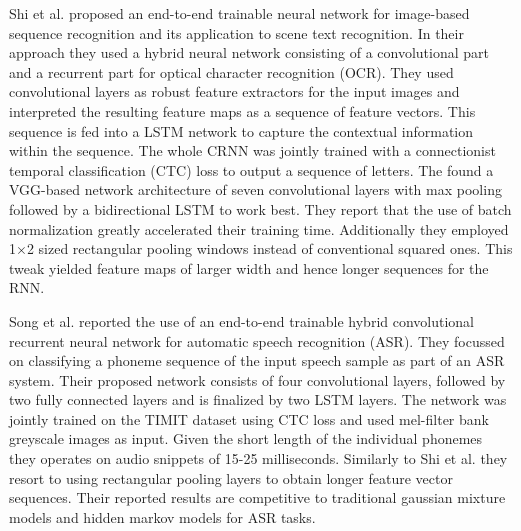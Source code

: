 Shi et al.\cite{shi2016end} proposed an end-to-end trainable neural network for image-based sequence recognition and its application to scene text recognition. In their approach they used a hybrid neural network consisting of a convolutional part and a recurrent part for optical character recognition (OCR). They used convolutional layers as robust feature extractors for the input images and interpreted the resulting feature maps as a sequence of feature vectors. This sequence is fed into a LSTM network to capture the contextual information within the sequence. The whole CRNN was jointly trained with a connectionist temporal classification (CTC) loss \cite{graves2006connectionist} to output a sequence of letters. The found a VGG-based network architecture of seven convolutional layers with max pooling followed by a bidirectional LSTM to work best. They report that the use of batch normalization greatly accelerated their training time. Additionally they employed 1$\times$2 sized rectangular pooling windows instead of conventional squared ones. This tweak yielded feature maps of larger width and hence longer sequences for the RNN.

Song et al.\cite{song2015end} reported the use of an end-to-end trainable hybrid convolutional recurrent neural network for automatic speech recognition (ASR). They focussed on classifying a phoneme sequence of the input speech sample as part of an ASR system. Their proposed network consists of four convolutional layers, followed by two fully connected layers and is finalized by two LSTM layers. The network was jointly trained on the TIMIT dataset using CTC loss and used mel-filter bank greyscale images as input. Given the short length of the individual phonemes they operates on audio snippets of 15-25 milliseconds. Similarly to Shi et al. they resort to using rectangular pooling layers to obtain longer feature vector sequences. Their reported results are competitive to traditional gaussian mixture models and hidden markov models for ASR tasks. 

